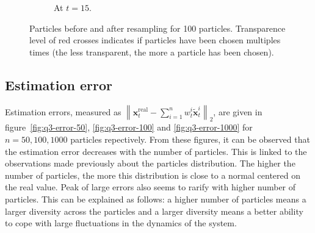 \documentclass[english, DIV=13]{scrartcl}
\newcommand\norm[1]{\left\lVert#1\right\rVert}
\begin{document}
\begin{figure}
\begin{subfigure}{0.49\textwidth}
        \caption{At $t=15$.}
        \label{fig:particle-15-100}
    \end{subfigure}
    \caption{Particles before and after resampling for 100 particles.
    Transparence level of red crosses indicates if particles have been chosen
    multiples times (the less transparent, the more a particle has been chosen).}
\end{figure}

\subsection{Estimation error}
Estimation errors, measured as 
$\norm{\mathbf{x}_t^{\text{real}} - \sum_{i=1}^n w_t^i\tilde{\mathbf{x}}_t^i}_2$,
are given in figure~\ref{fig:q3-error-50}, \ref{fig:q3-error-100} and
\ref{fig:q3-error-1000} for $n = 50, 100, 1000$ particles repectively.
From these figures, it can be observed that the estimation error decreases with the
number of particles. This is linked to the observations made previously about the
particles distribution. The higher the number of particles, the more this distribution
is close to a normal centered on the real value. Peak of large errors also seems to
rarify with higher number of particles. This can be explained as follows: a higher
number of particles means a larger diversity across the particles and a larger diversity
means a better ability to cope with large fluctuations in the dynamics of the system.
\end{document}

